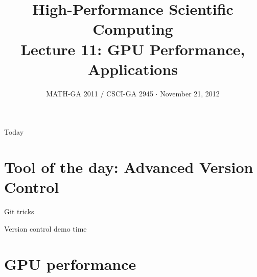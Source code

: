 \documentclass[english,compress]{beamer}
\begin{document}

\title{High-Performance Scientific Computing\\Lecture 11: GPU Performance, Applications}

\date{MATH-GA 2011 / CSCI-GA 2945 $\cdot$ November 21, 2012}

\frame{\titlepage}

\begin{frame}{Today}
  \tableofcontents[hideallsubsections]
\end{frame}
\begin{comment}
\begin{frame}{Bits and pieces}
  \begin{itemize}
    \item Don't have a project? Let's fix that \emph{very soon}
    \item HW5: soon
    \item HW6: due today
    \item Dec 5: Last day of regular class
    \item Dec 12: Legislative Day
    \item Dec 17/18/\textbf{19}: Project presentations
    \item Don't have grade reports for HW1\dots4? Talk to me
  \end{itemize}
\end{frame}
\end{comment}

\section[Version Control]{Tool of the day: Advanced Version Control}
\begin{frame}{Git tricks}
  \begin{center}
  \Huge Version control demo time
  \end{center}
\end{frame}
\section{GPU performance}
\end{document}
